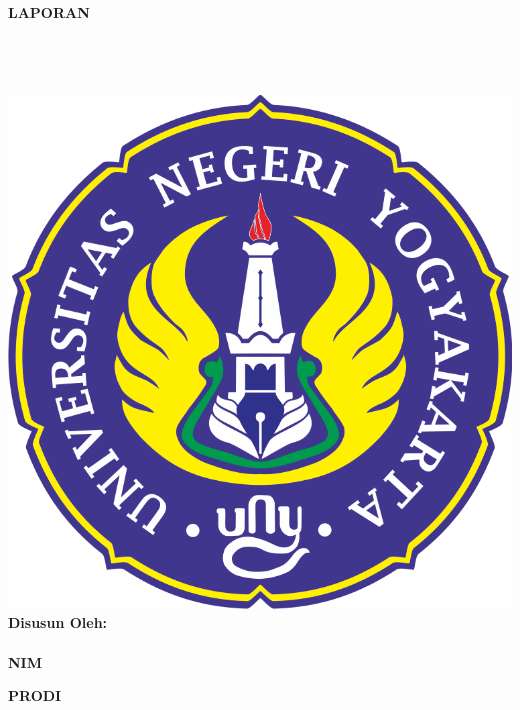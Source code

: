 

\begin{titlepage}
    \begin{center}

        \begin{doublespace}
            \textbf{\Large{\MakeUppercase{Laporan \tipe}}}\\[1cm]
            \textbf{\large{\MakeUppercase{\judulid}}}\\[0.75cm]
            \textbf{\MakeUppercase{\large{\perusahaan}}}\\[0.5cm]
        \end{doublespace}
        {\alamatperusahaan}\\[0.5cm]

        \includegraphics[width=0.45\linewidth]{gambar/logo-uny.png}\\[1.5cm]

        \textbf{Disusun Oleh:} \\
        \textbf{\MakeUppercase{{\penulis}}} \\
        \textbf{NIM} \textbf{{\nim}}\\[2cm]

        \vfill

        \textbf{\large \MakeUppercase{Prodi \prodi}}\\
        \textbf{\large \MakeUppercase{\fakultas}}\\
        \textbf{\large \MakeUppercase{\universitas}}\\
        \textbf{\large \the\year{}}\\
    \end{center}
\end{titlepage}

